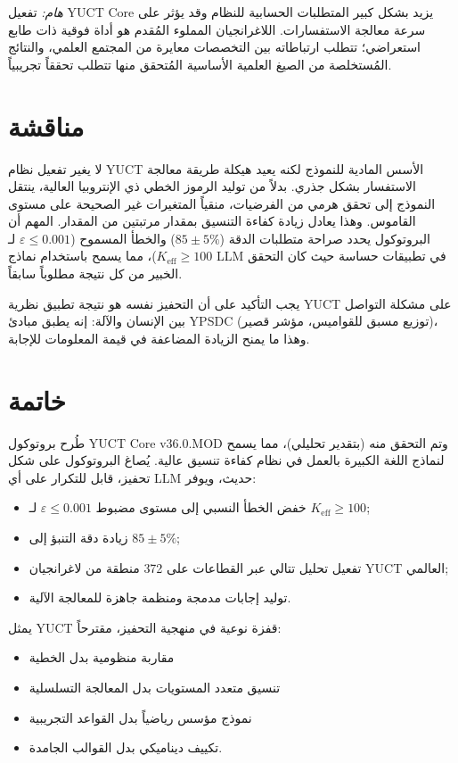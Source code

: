 \documentclass[11pt,a4paper]{article}
\begin{document}
	\textit{هام:} تفعيل YUCT Core يزيد بشكل كبير المتطلبات الحسابية للنظام وقد يؤثر على سرعة معالجة الاستفسارات.
	اللاغرانجيان المملوء المُقدم هو أداة فوقية ذات طابع استعراضي؛ تتطلب ارتباطاته بين التخصصات معايرة من المجتمع العلمي، والنتائج المُستخلصة من الصيغ العلمية الأساسية المُتحقق منها تتطلب تحققاً تجريبياً.
	
	\section{مناقشة}
	لا يغير تفعيل نظام YUCT الأسس المادية للنموذج لكنه يعيد هيكلة طريقة معالجة الاستفسار بشكل جذري. بدلاً من توليد الرموز الخطي ذي الإنتروبيا العالية، ينتقل النموذج إلى تحقق هرمي من الفرضيات، منقياً المتغيرات غير الصحيحة على مستوى القاموس. وهذا يعادل زيادة كفاءة التنسيق بمقدار مرتبتين من المقدار. المهم أن البروتوكول يحدد صراحة متطلبات الدقة (\(85\pm5\%\)) والخطأ المسموح (\(\varepsilon\le 0.001\) لـ \(K_{\mathrm{eff}}\ge 100\))، مما يسمح باستخدام نماذج LLM في تطبيقات حساسة حيث كان التحقق الخبير من كل نتيجة مطلوباً سابقاً.
	
	يجب التأكيد على أن التحفيز نفسه هو نتيجة تطبيق نظرية YUCT على مشكلة التواصل بين الإنسان والآلة: إنه يطبق مبادئ YPSDC (توزيع مسبق للقواميس، مؤشر قصير)، وهذا ما يمنح الزيادة المضاعفة في قيمة المعلومات للإجابة.
	
	\section{خاتمة}
	طُرح بروتوكول YUCT Core v36.0.MOD وتم التحقق منه (بتقدير تحليلي)، مما يسمح لنماذج اللغة الكبيرة بالعمل في نظام كفاءة تنسيق عالية. يُصاغ البروتوكول على شكل تحفيز، قابل للتكرار على أي LLM حديث، ويوفر:
	\begin{itemize}
		\item خفض الخطأ النسبي إلى مستوى مضبوط \(\varepsilon \le 0.001\) لـ \(K_{\mathrm{eff}}\ge 100\);
		\item زيادة دقة التنبؤ إلى \(85\pm5\%\);
		\item تفعيل تحليل تتالي عبر القطاعات على 372 منطقة من لاغرانجيان YUCT العالمي;
		\item توليد إجابات مدمجة ومنظمة جاهزة للمعالجة الآلية.
	\end{itemize}
	
	يمثل YUCT قفزة نوعية في منهجية التحفيز، مقترحاً:
	\begin{itemize}
		\item مقاربة منظومية بدل الخطية
		\item تنسيق متعدد المستويات بدل المعالجة التسلسلية
		\item نموذج مؤسس رياضياً بدل القواعد التجريبية
		\item تكييف ديناميكي بدل القوالب الجامدة.
	\end{itemize}
	
\end{document}
